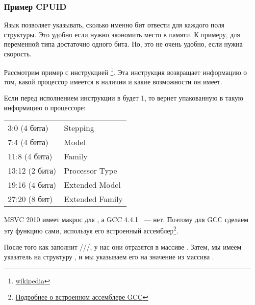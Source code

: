 \subsubsection{Пример CPUID}

Язык \CCpp позволяет указывать, сколько именно бит отвести для каждого поля структуры. 
Это удобно если нужно экономить место в памяти. К примеру, для переменной типа \Tbool достаточно одного бита.
Но, это не очень удобно, если нужна скорость.


\newcommand{\FNCPUID}{\footnote{\href{http://go.yurichev.com/17069}{wikipedia}}}

\label{cpuid}
Рассмотрим пример с инструкцией \CPUID\FNCPUID. 
Эта инструкция возвращает информацию о том, какой процессор имеется в наличии и какие возможности он имеет.

Если перед исполнением инструкции в \EAX будет 1, 
то \CPUID вернет упакованную в \EAX такую информацию о процессоре:

\begin{center}
\begin{tabular}{ | l | l | }
\hline
3:0 (4 бита)& Stepping \\
7:4 (4 бита) & Model \\
11:8 (4 бита) & Family \\
13:12 (2 бита) & Processor Type \\
19:16 (4 бита) & Extended Model \\
27:20 (8 бит) & Extended Family \\
\hline
\end{tabular}
\end{center}

\newcommand{\FNGCCAS}{\footnote{\href{http://go.yurichev.com/17070}
{Подробнее о встроенном ассемблере GCC}}}

MSVC 2010 имеет макрос для \CPUID, а GCC 4.4.1 ~--- нет. 
Поэтому для GCC сделаем эту функцию сами, используя его встроенный ассемблер\FNGCCAS.



После того как \CPUID заполнит \EAX/\EBX/\ECX/\EDX, у нас они отразятся в массиве . 
Затем, мы имеем указатель на структуру , и мы указываем его на значение 
\EAX из массива .

